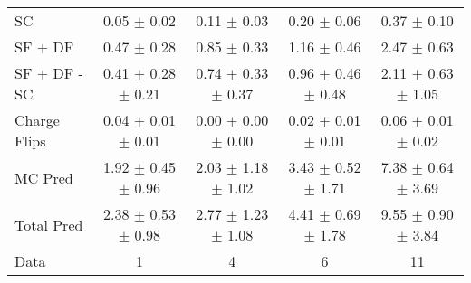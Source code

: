 \begin{tabular}{l|cccc}
                                 SC &  0.05 $\pm$  0.02 &  0.11 $\pm$  0.03 &  0.20 $\pm$  0.06 &  0.37 $\pm$  0.10 \\
                            SF + DF &  0.47 $\pm$  0.28 &  0.85 $\pm$  0.33 &  1.16 $\pm$  0.46 &  2.47 $\pm$  0.63 \\
\hline
                       SF + DF - SC &  0.41 $\pm$  0.28 $\pm$  0.21 &  0.74 $\pm$  0.33 $\pm$  0.37 &  0.96 $\pm$  0.46 $\pm$  0.48 &  2.11 $\pm$  0.63 $\pm$  1.05 \\
\hline\hline
                       Charge Flips &  0.04 $\pm$  0.01 $\pm$  0.01 &  0.00 $\pm$  0.00 $\pm$  0.00 &  0.02 $\pm$  0.01 $\pm$  0.01 &  0.06 $\pm$  0.01 $\pm$  0.02 \\
\hline
                            MC Pred &  1.92 $\pm$  0.45 $\pm$  0.96 &  2.03 $\pm$  1.18 $\pm$  1.02 &  3.43 $\pm$  0.52 $\pm$  1.71 &  7.38 $\pm$  0.64 $\pm$  3.69 \\
\hline
                         Total Pred &  2.38 $\pm$  0.53 $\pm$  0.98 &  2.77 $\pm$  1.23 $\pm$  1.08 &  4.41 $\pm$  0.69 $\pm$  1.78 &  9.55 $\pm$  0.90 $\pm$  3.84 \\
\hline\hline
                               Data &     1 &     4 &     6 &    11 \\
\hline\hline
\end{tabular}

